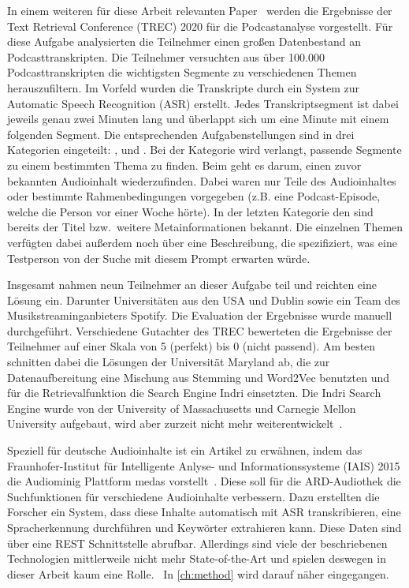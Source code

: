 In einem weiteren für diese Arbeit relevanten Paper~\cite{jones2021} werden die Ergebnisse der Text Retrieval Conference (TREC) 2020 für die Podcastanalyse vorgestellt.
Für diese Aufgabe analysierten die Teilnehmer einen großen Datenbestand an Podcasttranskripten.
Die Teilnehmer versuchten aus über 100.000 Podcasttranskripten die wichtigsten Segmente zu verschiedenen Themen herauszufiltern.
Im Vorfeld wurden die Transkripte durch ein System zur Automatic Speech Recognition (ASR) erstellt.
Jedes Transkriptsegment ist dabei jeweils genau zwei Minuten lang und überlappt sich um eine Minute mit einem folgenden Segment.
Die entsprechenden Aufgabenstellungen sind in drei Kategorien eingeteilt: ,  und .
Bei der Kategorie  wird verlangt, passende Segmente zu einem bestimmten Thema zu finden.
Beim  geht es darum, einen zuvor bekannten Audioinhalt wiederzufinden.
Dabei waren nur Teile des Audioinhaltes oder bestimmte Rahmenbedingungen vorgegeben (z.B. eine Podcast-Episode, welche die Person vor einer Woche hörte).
In der letzten Kategorie den  sind bereits der Titel bzw.\ weitere Metainformationen bekannt.
Die einzelnen Themen verfügten dabei außerdem noch über eine Beschreibung, die spezifiziert, was eine Testperson von der Suche mit diesem Prompt erwarten würde.


Insgesamt nahmen neun Teilnehmer an dieser Aufgabe teil und reichten eine Lösung ein.
Darunter Universitäten aus den USA und Dublin sowie ein Team des Musikstreaminganbieters Spotify.
Die Evaluation der Ergebnisse wurde manuell durchgeführt.
Verschiedene Gutachter des TREC bewerteten die Ergebnisse der Teilnehmer auf einer Skala von 5 (perfekt) bis 0 (nicht passend).
Am besten schnitten dabei die Lösungen der Universität Maryland ab, die zur Datenaufbereitung eine Mischung aus Stemming und Word2Vec benutzten und für die Retrievalfunktion die Search Engine Indri einsetzten.
Die Indri Search Engine wurde von der University of Massachusetts und Carnegie Mellon University aufgebaut, wird aber zurzeit nicht mehr weiterentwickelt~\cite{lemur}.


Speziell für deutsche Audioinhalte ist ein Artikel zu erwähnen, indem das Fraunhofer-Institut für Intelligente Anlyse- und Informationssysteme (IAIS) 2015 die Audiominig Plattform medas vorstellt~\cite{maroni2020}.
Diese soll für die ARD-Audiothek die Suchfunktionen für verschiedene Audioinhalte verbessern.
Dazu erstellten die Forscher ein System, dass diese Inhalte automatisch mit ASR transkribieren, eine Spracherkennung durchführen und Keywörter extrahieren kann.
Diese Daten sind über eine REST Schnittstelle abrufbar.
Allerdings sind viele der beschriebenen Technologien mittlerweile nicht mehr State-of-the-Art und spielen deswegen in dieser Arbeit kaum eine Rolle.~\cite{maroni2020}
In \autoref{ch:method} wird darauf näher eingegangen.
